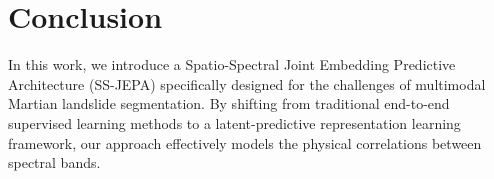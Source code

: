 \section{Conclusion}
\label{sec:conclusion}






In this work, we introduce a Spatio-Spectral Joint Embedding Predictive Architecture (SS-JEPA) specifically designed for the challenges of multimodal Martian landslide segmentation. By shifting from traditional end-to-end supervised learning methods to a latent-predictive representation learning framework, our approach effectively models the physical correlations between spectral bands.

